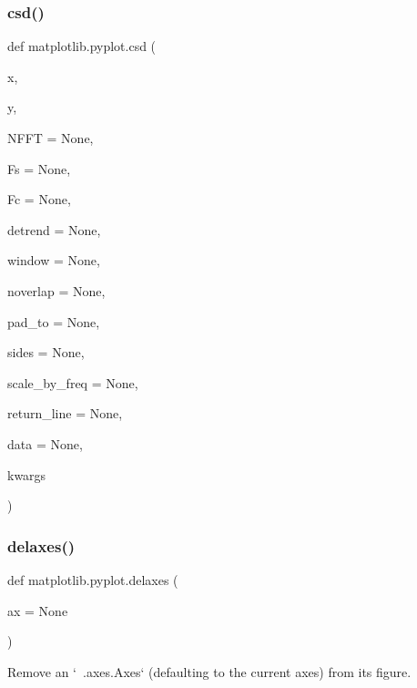 \mbox{\label{namespacematplotlib_1_1pyplot_aa0056d23acae30f6dad62cc213ed6842}} 
\subsubsection{\texorpdfstring{csd()}{csd()}}
{\footnotesize\ttfamily def matplotlib.\+pyplot.\+csd (\begin{DoxyParamCaption}\item[{}]{x,  }\item[{}]{y,  }\item[{}]{N\+F\+FT = {\ttfamily None},  }\item[{}]{Fs = {\ttfamily None},  }\item[{}]{Fc = {\ttfamily None},  }\item[{}]{detrend = {\ttfamily None},  }\item[{}]{window = {\ttfamily None},  }\item[{}]{noverlap = {\ttfamily None},  }\item[{}]{pad\+\_\+to = {\ttfamily None},  }\item[{}]{sides = {\ttfamily None},  }\item[{}]{scale\+\_\+by\+\_\+freq = {\ttfamily None},  }\item[{}]{return\+\_\+line = {\ttfamily None},  }\item[{}]{data = {\ttfamily None},  }\item[{}]{kwargs }\end{DoxyParamCaption})}

\mbox{\label{namespacematplotlib_1_1pyplot_ae2619961af9edc4db42a37429e4f2897}} 
\subsubsection{\texorpdfstring{delaxes()}{delaxes()}}
{\footnotesize\ttfamily def matplotlib.\+pyplot.\+delaxes (\begin{DoxyParamCaption}\item[{}]{ax = {\ttfamily None} }\end{DoxyParamCaption})}

\begin{DoxyVerb}Remove an `~.axes.Axes` (defaulting to the current axes) from its figure.
\end{DoxyVerb}
 \mbox{\label{namespacematplotlib_1_1pyplot_a15f618539c417d800504a0b7896a9876}} 
